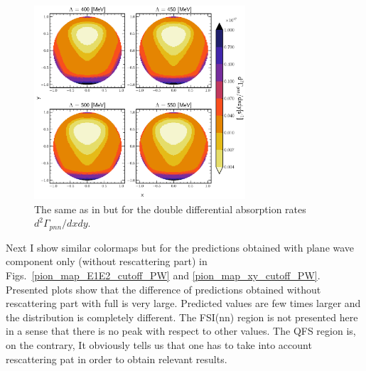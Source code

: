     \begin{figure}[h]
        \begin{center}
        \includegraphics[width=0.7\textwidth]{PlotData/PION/Dalitz_maps/figures/Dalitz_map_pnn_xy_cutofs.pdf}
        \end{center}
        \caption{The same as in  but for the double differential absorption rates
        $d^2 \Gamma_{pnn}/dxdy$.}
        \label{pion_map_xy_cutoff}
    \end{figure}

    Next I show similar colormaps but for the predictions obtained with plane wave component only (without rescattering part)
    in Figs.~\ref{pion_map_E1E2_cutoff_PW} and \ref{pion_map_xy_cutoff_PW}. Presented plots show that
    the difference of predictions obtained without rescattering part with full is very large. 
    Predicted values 
    are few times larger and the distribution is completely different.
    The FSI(nn) region is not presented here in a sense that there is no peak with respect to other 
    values. The QFS region is, on the contrary, 
    It obviously tells us that one has to take into account rescattering pat in order to obtain relevant results.   

